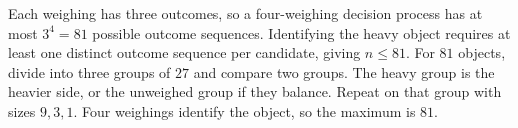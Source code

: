 Each weighing has three outcomes, so a four-weighing decision process has at most $3^4=81$ possible outcome sequences. Identifying the heavy object requires at least one distinct outcome sequence per candidate, giving $n\le81$. For $81$ objects, divide into three groups of $27$ and compare two groups. The heavy group is the heavier side, or the unweighed group if they balance. Repeat on that group with sizes $9,3,1$. Four weighings identify the object, so the maximum is $\boxed{81}$.
